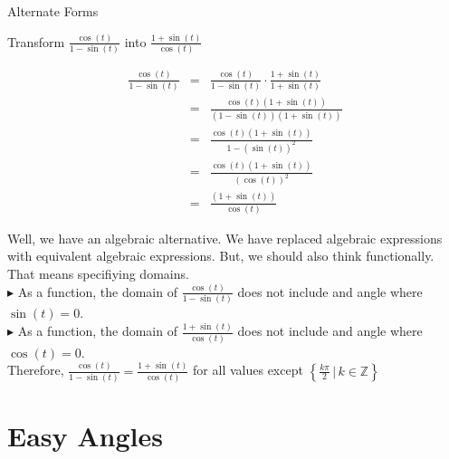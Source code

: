 \documentclass{ximera}
\begin{document}
\begin{example} Alternate Forms


Transform $\frac{\cos(t)}{1 - \sin(t)}$ into $\frac{1 + \sin(t)}{\cos(t)}$



\begin{explanation}

\begin{align*}
\frac{\cos(t)}{1 - \sin(t)}  &  = &  \frac{\cos(t)}{1 - \sin(t)}  \cdot \frac{1 + \sin(t)}{1 + \sin(t)}  \\
                           &  = &  \frac{\cos(t)(1 + \sin(t))}{(1 - \sin(t))(1 + \sin(t))}  \\
                           &  = &  \frac{\cos(t)(1 + \sin(t))}{1 - (\sin(t))^2}  \\
                           &  = &  \frac{\cos(t)(1 + \sin(t))}{(\cos(t))^2}  \\
                           &  = &  \frac{(1 + \sin(t))}{\cos(t)}  
\end{align*}



\end{explanation}


Well, we have an algebraic alternative.  We have replaced algebraic expressions with equivalent algebraic expressions.  But, we should also think functionally.  That means specifiying domains.  \\


$\blacktriangleright$ As a function, the domain of $\frac{\cos(t)}{1 - \sin(t)}$ does not include and angle where $\sin(t) = 0$. \\

$\blacktriangleright$ As a function, the domain of $\frac{1 + \sin(t)}{\cos(t)}$ does not include and angle where $\cos(t) = 0$. \\



Therefore, $\frac{\cos(t)}{1 - \sin(t)} = \frac{1 + \sin(t)}{\cos(t)}$ for all values except $\left\{   \frac{k \pi}{2} \, | \, k \in \mathbb{Z}      \right\}$

\end{example}










\section*{Easy Angles}
\end{document}
